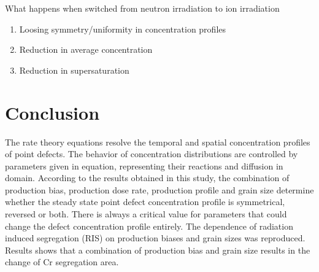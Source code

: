 \documentclass[utf8]{frontiersSCNS} %
\begin{document}
  What happens when switched from neutron irradiation to ion irradiation
  \begin{enumerate}
    \item Loosing symmetry/uniformity in concentration profiles
    \item Reduction in average concentration
    \item Reduction in supersaturation
  \end{enumerate}

\clearpage
\section{Conclusion} \hspace{10pt}

The rate theory equations resolve the temporal and spatial concentration profiles of point defects. The behavior of concentration distributions are controlled by parameters given in equation, representing their reactions and diffusion in domain. According to the results obtained in this study, the combination of production bias, production dose rate, production profile and grain size determine whether the steady state point defect concentration profile is symmetrical, reversed or both. There is always a critical value for parameters that could change the defect concentration profile entirely.
The dependence of radiation induced segregation (RIS) on production biases and grain sizes was reproduced. Results shows that a combination of production bias and grain size results in the change of Cr segregation area.


\clearpage


\end{document}
